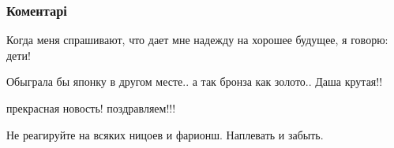  
 
 
 
 
\subsubsection{Коментарі}

\begin{itemize}
 
Когда меня спрашивают, что дает мне надежду на хорошее будущее, я говорю: дети!

 
Обыграла бы японку в другом месте.. а так бронза как золото.. Даша крутая!!

 
прекрасная новость! поздравляем!!!

 
Не реагируйте на всяких ницоев и фарионш. Наплевать и забыть.

\begin{itemize}
 

\end{itemize}
\end{itemize}
